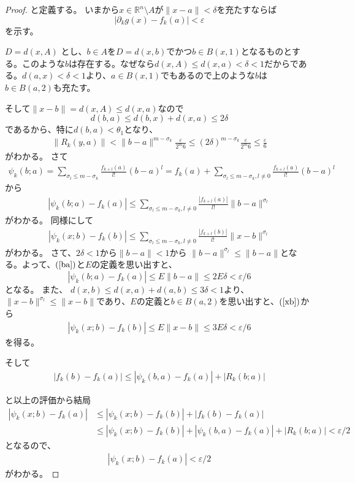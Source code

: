 \documentclass[leqno]{jsarticle}
\newcommand{\rr}{\mathbb{R}}
\newcommand{\ep}{\varepsilon}
\begin{document}
\begin{proof}
と定義する。
いまから$x\in \rr^n\setminus A$が$\|x-a\|<\delta$を充たすならば
\[
|\partial_kg(x)-f_k(a)|<\ep
\]
を示す。

$D=d(x, A)$
とし、$b\in A$を$D=d(x,b)$でかつ$b\in B(x, 1)$となるものとする。このような$b$は存在する。なぜなら$d(x,A)\le d(x, a)<\delta<1$だからである。$d(a,x)<\delta<1$より、$a\in B(x,1)$でもあるので上のような$b$は$b\in B(a,2)$も充たす。

そして$\|x-b\|=d(x,A)\le d(x,a)$なので
\[
d(b,a)\le d(b,x)+d(x,a)\le 2\delta
\]
であるから、特に$d(b,a)<\theta_1$となり、
\begin{align*}
\|R_k(y,a)\|<\|b-a\|^{m-\sigma_k}\frac{\ep}{2^m6}\le (2\delta)^{m-\sigma_k}\frac{\ep}{2^m6}\le \frac{\ep}{6}
\end{align*}
がわかる。
さて
\begin{align*}
\psi_k(b;a)=\sum_{\sigma_l\le m-\sigma_k}\frac{f_{k+l}(a)}{l!}(b-a)^l
=f_k(a)+\sum_{\sigma_l\le m-\sigma_k, l\neq 0}\frac{f_{k+l}(a)}{l!}(b-a)^l
\end{align*}
から
\begin{align}\label{ba}
|\psi_k(b;a)-f_k(a)|\le \sum_{\sigma_l\le m-\sigma_k, l\neq 0}\frac{|f_{k+l}(a)|}{l!}\| b-a\|^{\sigma_l}
\end{align}
がわかる。
同様にして
\begin{align}\label{xb}
|\psi_k(x;b)-f_k(b)|\le \sum_{\sigma_l\le m-\sigma_k, l\neq 0}\frac{|f_{k+l}(b)|}{l!}\| x-b\|^{\sigma_l}
\end{align}
がわかる。
さて、$2\delta<1$から$\|b-a\|<1$から
$\|b-a\|^{\sigma_l}\le \|b-a\|$となる。よって、$(\ref{ba})$と$E$の定義を思い出すと、
\[
|\psi_k(b;a)-f_k(a)|\le E \|b-a\|\le 2E\delta<\ep/6
\]
となる。
また、
$d(x,b)\le d(x,a)+d(a,b)\le 3\delta<1$より、
$\|x-b\|^{\sigma_l}\le \|x-b\|$であり、$E$の定義と$b\in B(a,2)$を思い出すと、$(\ref{xb})$から
\begin{align}
|\psi_k(x;b)-f_k(b)|\le E\|x-b\|\le 3E\delta<\ep/6
\end{align}
を得る。

そして
\begin{align}
|f_k(b)-f_k(a)|\le |\psi_k(b,a)-f_k(a)|+|R_k(b;a)|
\end{align}

と以上の評価から結局
\begin{align*}
|\psi_k(x;b)-f_k(a)|&\le |\psi_k(x;b)-f_k(b)|+|f_k(b)-f_k(a)|\\
&\le |\psi_k(x;b)-f_k(b)|+|\psi_k(b,a)-f_k(a)|+|R_k(b;a)| < \ep/2
\end{align*}
となるので、
\begin{align}\label{444}
|\psi_k(x;b)-f_k(a)|<\ep/2
\end{align}
がわかる。


\end{proof}
\end{document}
